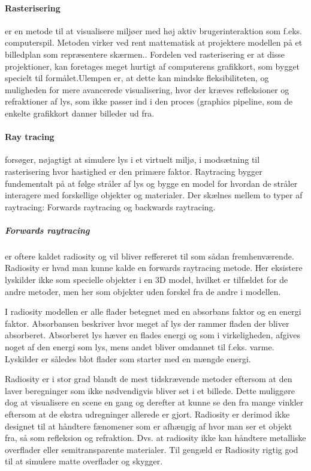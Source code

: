 \paragraph{Rasterisering}
er en metode til at visualisere miljøer med høj aktiv brugerinteraktion som f.eks. computerspil.\cite{rastarization} Metoden virker ved rent mattematisk at projektere modellen på et billedplan som repræsentere skærmen.\cite{rastarization}. Fordelen ved rasterisering er at disse projektioner, kan foretages meget hurtigt af computerens grafikkort, som bygget specielt til formålet\cite{rastarization}.\newline Ulempen er, at dette kan mindske fleksibiliteten, og muligheden for mere avancerede visualisering, hvor der kræves refleksioner og refraktioner af lys, som ikke passer ind i den proces (graphics pipeline\cite{rastarization}, som de enkelte grafikkort danner billeder ud fra. 

\paragraph{Ray tracing}\cite{raytracing_for_begyndere} forsøger, nøjagtigt at simulere lys i et virtuelt miljø, i modsætning til rasterisering hvor hastighed er den primære faktor. Raytracing bygger fundementalt på at følge stråler af lys og bygge en model for hvordan de stråler interagere med forskellige objekter og materialer. Der skælnes mellem to typer af raytracing: Forwards raytracing og backwards raytracing.

\subparagraph{Forwards raytracing}\cite{radiosity_by_wpi,radiosity_by_uob} er oftere kaldet radiosity og vil bliver reffereret til som sådan fremhenværende. Radiosity er hvad man kunne kalde en forwards raytracing metode. Her eksistere lyskilder ikke som specielle objekter i en 3D model, hvilket er tilfældet for de andre metoder, men her som objekter uden forskel fra de andre i modellen.

I radiosity modellen er alle flader betegnet med en absorbans faktor og en energi faktor. Absorbansen beskriver hvor meget af lys der rammer fladen der bliver absorberet. Absorberet lys hæver en flades energi og som i virkeligheden, afgives noget af den energi som lys, mens andet bliver omdannet til f.eks. varme. Lyskilder er således blot flader som starter med en mængde energi.

Radiosity er i stor grad blandt de mest tidskrævende metoder eftersom at den laver beregninger som ikke nødvendigvis bliver set i et billede. Dette muliggøre dog at visualisere en scene en gang og derefter at kunne se den fra mange vinkler eftersom at de ekstra udregninger allerede er gjort. Radiosity er derimod ikke designet til at håndtere fænomener som er afhængig af hvor man ser et objekt fra, så som refleksion og refraktion. Dvs. at radiosity ikke kan håndtere metalliske overflader eller semitransparente materialer. Til gengæld er Radiosity rigtig god til at simulere matte overflader og skygger.

